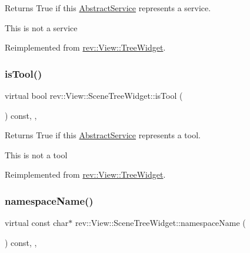 Returns True if this \mbox{\hyperlink{classrev_1_1_abstract_service}{Abstract\+Service}} represents a service. 

This is not a service 

Reimplemented from \mbox{\hyperlink{classrev_1_1_view_1_1_tree_widget_a9f10e939850acf8fce1992b5b9b3fc24}{rev\+::\+View\+::\+Tree\+Widget}}.

\mbox{\label{classrev_1_1_view_1_1_scene_tree_widget_a291ef1fb24cd270729d826099c730366}} 
\subsubsection{\texorpdfstring{isTool()}{isTool()}}
{\footnotesize\ttfamily virtual bool rev\+::\+View\+::\+Scene\+Tree\+Widget\+::is\+Tool (\begin{DoxyParamCaption}{ }\end{DoxyParamCaption}) const\hspace{0.3cm}{\ttfamily [inline]}, {\ttfamily [override]}, {\ttfamily [virtual]}}



Returns True if this \mbox{\hyperlink{classrev_1_1_abstract_service}{Abstract\+Service}} represents a tool. 

This is not a tool 

Reimplemented from \mbox{\hyperlink{classrev_1_1_view_1_1_tree_widget_a7ff55c9e8c83c70e9331a7fe7acafbb6}{rev\+::\+View\+::\+Tree\+Widget}}.

\mbox{\label{classrev_1_1_view_1_1_scene_tree_widget_a8d388e6e5f396f5641a92a29fb42bf6c}} 
\subsubsection{\texorpdfstring{namespaceName()}{namespaceName()}}
{\footnotesize\ttfamily virtual const char$\ast$ rev\+::\+View\+::\+Scene\+Tree\+Widget\+::namespace\+Name (\begin{DoxyParamCaption}{ }\end{DoxyParamCaption}) const\hspace{0.3cm}{\ttfamily [inline]}, {\ttfamily [override]}, {\ttfamily [virtual]}}



